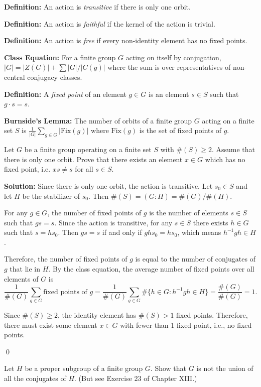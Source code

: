 \textbf{Definition:} An action is \textit{transitive} if there is only one orbit.

\textbf{Definition:} An action is \textit{faithful} if the kernel of the action is trivial.

\textbf{Definition:} An action is \textit{free} if every non-identity element has no fixed points.

\textbf{Class Equation:} For a finite group $G$ acting on itself by conjugation, $|G| = |Z(G)| + \sum |G|/|C(g)|$ where the sum is over representatives of non-central conjugacy classes.

\textbf{Definition:} A \textit{fixed point} of an element $g \in G$ is an element $s \in S$ such that $g \cdot s = s$.

\textbf{Burnside's Lemma:} The number of orbits of a finite group $G$ acting on a finite set $S$ is $\frac{1}{|G|} \sum_{g \in G} |\text{Fix}(g)|$ where $\text{Fix}(g)$ is the set of fixed points of $g$.

\begin{problembox}
Let $G$ be a finite group operating on a finite set $S$ with $\#(S) \geq 2$. Assume that there is only one orbit. Prove that there exists an element $x \in G$ which has no fixed point, i.e. $xs \neq s$ for all $s \in S$.
\end{problembox}

\noindent\textbf{Solution:} Since there is only one orbit, the action is transitive. Let $s_0 \in S$ and let $H$ be the stabilizer of $s_0$. Then $\#(S) = (G : H) = \#(G)/\#(H)$.

For any $g \in G$, the number of fixed points of $g$ is the number of elements $s \in S$ such that $gs = s$. Since the action is transitive, for any $s \in S$ there exists $h \in G$ such that $s = hs_0$. Then $gs = s$ if and only if $ghs_0 = hs_0$, which means $h^{-1}gh \in H$.

Therefore, the number of fixed points of $g$ is equal to the number of conjugates of $g$ that lie in $H$. By the class equation, the average number of fixed points over all elements of $G$ is
\[\frac{1}{\#(G)} \sum_{g \in G} \text{fixed points of } g = \frac{1}{\#(G)} \sum_{g \in G} \#\{h \in G : h^{-1}gh \in H\} = \frac{\#(G)}{\#(G)} = 1.\]

Since $\#(S) \geq 2$, the identity element has $\#(S) > 1$ fixed points. Therefore, there must exist some element $x \in G$ with fewer than 1 fixed point, i.e., no fixed points.


\qed
\begin{problembox}
Let $H$ be a proper subgroup of a finite group $G$. Show that $G$ is not the union of all the conjugates of $H$. (But see Exercise 23 of Chapter XIII.)
\end{problembox}

